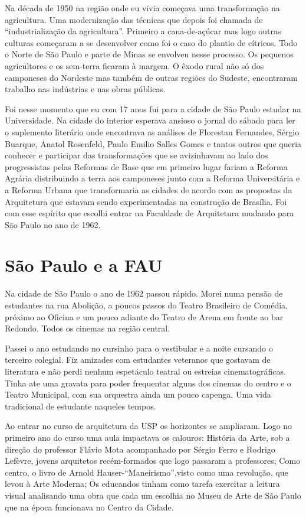 Na década de 1950 na região onde eu vivia começava uma transformação na
agricultura. Uma modernização das técnicas que depois foi chamada de
“industrialização da agricultura”. Primeiro a cana-de-açúcar mas logo
outras culturas começaram a se desenvolver como foi o caso do plantio de
cítricos. Todo o Norte de São Paulo e parte de Minas se envolveu nesse
processo. Os pequenos agricultores e os sem-terra ficaram à margem. O
êxodo rural não só dos camponeses do Nordeste mas também de outras
regiões do Sudeste, encontraram trabalho nas indústrias e nas obras
públicas.

Foi nesse momento que eu com 17 anos fui para a cidade de São Paulo
estudar na Universidade. Na cidade do interior esperava ansioso o jornal
do sábado para ler o suplemento literário onde encontrava as análises de
Florestan Fernandes, Sérgio Buarque, Anatol Rosenfeld, Paulo Emilio
Salles Gomes e tantos outros que queria conhecer e participar das
transformações que se avizinhavam ao lado dos progressistas pelas
Reformas de Base que em primeiro lugar fariam a Reforma Agrária
distribuindo a terra aos camponeses junto com a Reforma Universitária e
a Reforma Urbana que transformaria as cidades de acordo com as propostas
da Arquitetura que estavam sendo experimentadas na construção de
Brasília. Foi com esse espírito que escolhi entrar na Faculdade de
Arquitetura mudando para São Paulo no ano de 1962.

\section{São Paulo e a FAU}

Na cidade de São Paulo o ano de 1962 passou rápido. Morei numa pensão de
estudantes na rua Abolição, a poucos passos do Teatro Brasileiro de
Comédia, próximo ao Oficina e um pouco adiante do Teatro de Arena em
frente ao bar Redondo. Todos os cinemas na região central.

Passei o ano estudando no cursinho para o vestibular e a noite cursando
o terceiro colegial. Fiz amizades com estudantes veteranos que gostavam
de literatura e não perdi nenhum espetáculo teatral ou estreias
cinematográficas. Tinha ate uma gravata para poder frequentar alguns dos
cinemas do centro e o Teatro Municipal, com sua orquestra ainda um pouco
capenga. Uma vida tradicional de estudante naqueles tempos.

Ao entrar no curso de arquitetura da USP os horizontes se ampliaram.
Logo no primeiro ano do curso uma aula impactava os calouros: História
da Arte, sob a direção do professor Flávio Mota acompanhado por Sérgio
Ferro e Rodrigo Lefèvre, jovens arquitetos recém-formados que logo
passaram a professores; Como centro, o livro de Arnold
Hauser-“Maneirismo”,visto como uma revolução, que levou à Arte Moderna;
Os educandos tinham como tarefa exercitar a leitura visual analisando
uma obra que cada um escolhia no Museu de Arte de São Paulo que na época
funcionava no Centro da Cidade.

